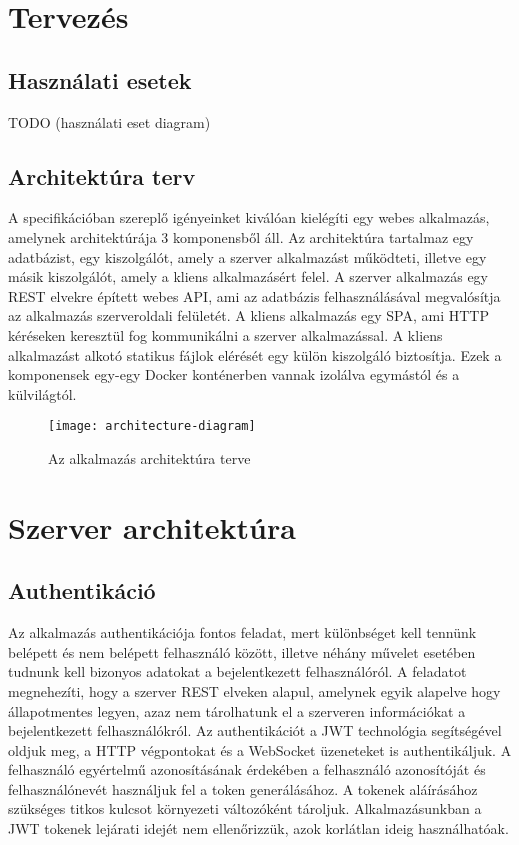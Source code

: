 \documentclass{elteikthesis}
\begin{document}
		\section{Tervezés}

			\subsection{Használati esetek}
			TODO (használati eset diagram)
			
			\subsection{Architektúra terv}
				A specifikációban szereplő igényeinket kiválóan kielégíti egy webes alkalmazás, amelynek architektúrája 3 komponensből áll. Az architektúra tartalmaz egy adatbázist, egy kiszolgálót, amely a szerver alkalmazást működteti, illetve egy másik kiszolgálót, amely a kliens alkalmazásért felel. A szerver alkalmazás egy REST elvekre épített webes API, ami az adatbázis felhasználásával megvalósítja az alkalmazás szerveroldali felületét. A kliens alkalmazás egy SPA, ami HTTP kéréseken keresztül fog kommunikálni a szerver alkalmazással. A kliens alkalmazást alkotó statikus fájlok elérését egy külön kiszolgáló biztosítja. Ezek a komponensek egy-egy Docker konténerben vannak izolálva egymástól és a külvilágtól.
				
				\begin{figure}[H]
					\centering
					\texttt{[image: architecture-diagram]}
					\caption{Az alkalmazás architektúra terve}
				\end{figure}
		
		\section{Szerver architektúra}

			\subsection{Authentikáció}
				Az alkalmazás authentikációja fontos feladat, mert különbséget kell tennünk belépett és nem belépett felhasználó között, illetve néhány művelet esetében tudnunk kell bizonyos adatokat a bejelentkezett felhasználóról. A feladatot megnehezíti, hogy a szerver REST elveken alapul, amelynek egyik alapelve hogy állapotmentes legyen, azaz nem tárolhatunk el a szerveren információkat a bejelentkezett felhasználókról. Az authentikációt a JWT technológia segítségével oldjuk meg, a HTTP végpontokat és a WebSocket üzeneteket is authentikáljuk. A felhasználó egyértelmű azonosításának érdekében a felhasználó azonosítóját és felhasználónevét használjuk fel a token generálásához. A tokenek aláírásához szükséges titkos kulcsot környezeti változóként tároljuk. Alkalmazásunkban a JWT tokenek lejárati idejét nem ellenőrizzük, azok korlátlan ideig használhatóak.
\end{document}
